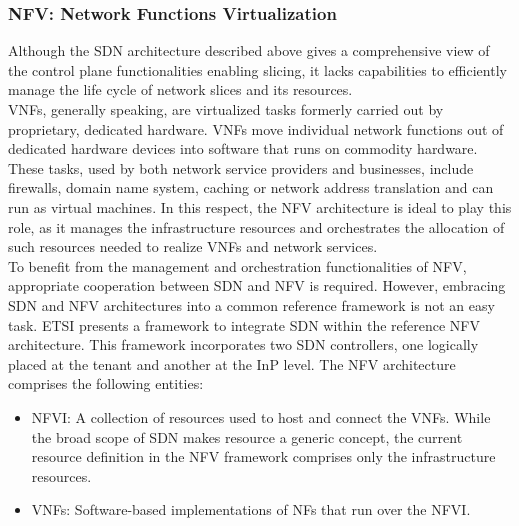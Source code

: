 \documentclass[a4paper,12pt]{report} %
\begin{document}
\subsubsection{NFV: Network Functions Virtualization}
Although the SDN architecture described above
gives a comprehensive view of the control plane
functionalities enabling slicing, it lacks capabilities
to efficiently manage the life cycle of
network slices and its resources. \\
VNFs, generally speaking, are virtualized tasks formerly carried out by proprietary, dedicated hardware. VNFs move individual network functions out of dedicated hardware devices into software that runs on commodity hardware. These tasks, used by both network service providers and businesses, include firewalls, domain name system, caching or network address translation and can run as virtual machines. In this respect, the NFV architecture is ideal to play
this role, as it manages the infrastructure resources
and orchestrates the allocation of such resources
needed to realize VNFs and network services.\\
To benefit from the management and orchestration functionalities of NFV, appropriate cooperation between SDN and NFV is required.
However, embracing SDN and NFV architectures
into a common reference framework is not an
easy task. ETSI presents a framework
to integrate SDN within the reference NFV architecture. This framework incorporates two SDN
controllers, one logically placed at the tenant and
another at the InP level. The NFV architecture comprises the following
entities:\\
\begin{itemize}
\item \gls{NFVI}: A collection of resources used to
host and connect the VNFs. While the broad scope of SDN makes resource a generic concept,
the current resource definition in the NFV framework comprises only the infrastructure resources.
\end{itemize}
\begin{itemize}
\item VNFs: Software-based implementations of NFs that run over the NFVI.
\end{itemize}
\end{document}

